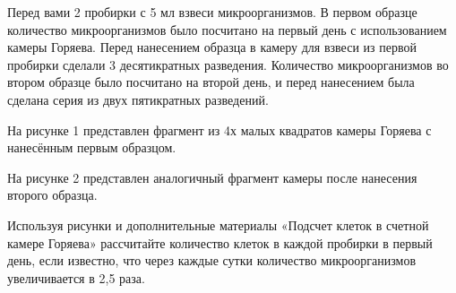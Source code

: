 
Перед вами 2 пробирки с 5 мл взвеси микроорганизмов. В первом образце количество микроорганизмов было посчитано на первый день с использованием камеры Горяева. Перед нанесением образца в камеру для взвеси из первой пробирки сделали 3 десятикратных разведения. Количество микроорганизмов во втором образце было посчитано на второй день, и перед нанесением была сделана серия из двух пятикратных разведений.

На рисунке 1 представлен фрагмент из 4х малых квадратов камеры Горяева с нанесённым первым образцом.

На рисунке 2 представлен аналогичный фрагмент камеры после нанесения второго образца.


Используя рисунки и дополнительные материалы «Подсчет клеток в счетной камере Горяева» рассчитайте количество клеток в каждой пробирки в первый день, если известно, что через каждые сутки количество микроорганизмов увеличивается в 2,5 раза.